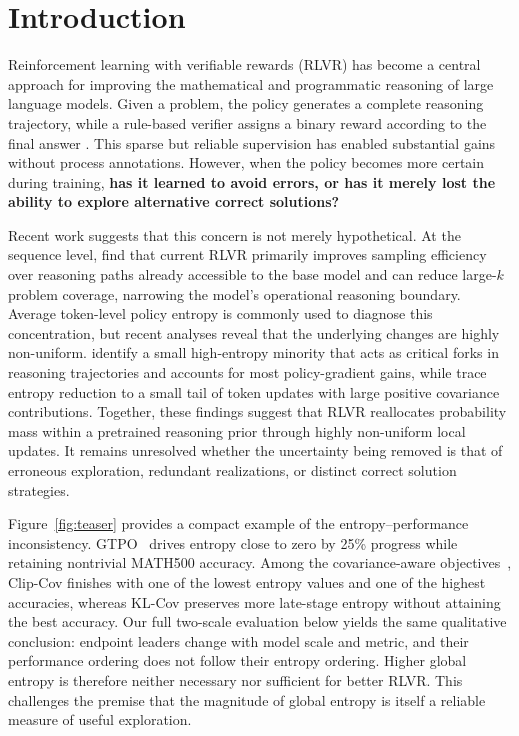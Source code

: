 \documentclass[letterpaper]{article} %
\begin{document}
\section{Introduction}

Reinforcement learning with verifiable rewards (RLVR) has become a central approach for improving the mathematical and programmatic reasoning of large language models. Given a problem, the policy generates a complete reasoning trajectory, while a rule-based verifier assigns a binary reward according to the final answer \citep{shao2024deepseekmath,deepseekai2025r1}. This sparse but reliable supervision has enabled substantial gains without process annotations. However, when the policy becomes more certain during training, \textbf{has it learned to avoid errors, or has it merely lost the ability to explore alternative correct solutions?}

Recent work suggests that this concern is not merely hypothetical. At the sequence level, \citet{yue2025capacity} find that current RLVR primarily improves sampling efficiency over reasoning paths already accessible to the base model and can reduce large-$k$ problem coverage, narrowing the model's operational reasoning boundary. Average token-level policy entropy is commonly used to diagnose this concentration, but recent analyses reveal that the underlying changes are highly non-uniform. \citet{wang2025forking} identify a small high-entropy minority that acts as critical forks in reasoning trajectories and accounts for most policy-gradient gains, while \citet{cui2025entropy} trace entropy reduction to a small tail of token updates with large positive covariance contributions. Together, these findings suggest that RLVR reallocates probability mass within a pretrained reasoning prior through highly non-uniform local updates. It remains unresolved whether the uncertainty being removed is that of erroneous exploration, redundant realizations, or distinct correct solution strategies.

Figure~\ref{fig:teaser} provides a compact example of the entropy--performance inconsistency. GTPO~\citep{simoni2025gtpo} drives entropy close to zero by 25\% progress while retaining nontrivial MATH500 accuracy. Among the covariance-aware objectives~\citep{cui2025entropy}, Clip-Cov finishes with one of the lowest entropy values and one of the highest accuracies, whereas KL-Cov preserves more late-stage entropy without attaining the best accuracy. Our full two-scale evaluation below yields the same qualitative conclusion: endpoint leaders change with model scale and metric, and their performance ordering does not follow their entropy ordering. Higher global entropy is therefore neither necessary nor sufficient for better RLVR. This challenges the premise that the magnitude of global entropy is itself a reliable measure of useful exploration.
\end{document}
